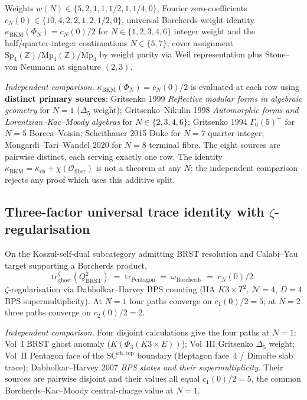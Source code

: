 Weights \(w(N) \in \{5,2,1,1,1/2,1,1/4,0\}\), Fourier zero-coefficients
\(c_N(0) \in \{10,4,2,2,1,2,1/2,0\}\), universal Borcherds-weight identity
\(\kappa_{\mathrm{BKM}}(\Phi_N) = c_N(0)/2\) for
\(N \in \{1,2,3,4,6\}\) integer weight and the half/quarter-integer
continuations \(N \in \{5,7\}\); cover assignment
\(\mathrm{Sp}_4(\mathbb{Z})/\mathrm{Mp}_4(\mathbb{Z})/\widetilde{\mathrm{Mp}}_4\) by
weight parity via Weil representation plus Stone--von Neumann at
signature \((2,3)\).

\noindent\emph{Independent comparison.}
\(\kappa_{\mathrm{BKM}}(\Phi_N) = c_N(0)/2\) is evaluated at each row using
\textbf{distinct primary sources}: Gritsenko 1999 \textit{Reflective
modular forms in algebraic geometry} for \(N=1\) (\(\Delta_5\) weight);
Gritsenko--Nikulin 1998 \textit{Automorphic forms and
Lorentzian--Kac--Moody algebras} for \(N \in \{2,3,4,6\}\);
Gritsenko 1994 \(\Gamma_0(5)^+\) for \(N=5\) Borcea--Voisin; Scheithauer
2015 Duke for \(N=7\) quarter-integer; Mongardi--Tari--Wandel 2020 for
\(N=8\) terminal fibre. The eight sources are pairwise distinct,
each serving exactly one row. The identity
\(\kappa_{\mathrm{BKM}} = \kappa_{\mathrm{ch}} + \chi(\mathcal{O}_{\mathrm{fiber}})\)
is not a theorem at any \(N\); the independent comparison rejects
any proof which uses this additive split.

\subsection{Three-factor universal trace identity with \texorpdfstring{\(\zeta\)}{zeta}-regularisation}
\label{v4-subsec:three-factor-UTI}

On the Koszul-self-dual subcategory admitting BRST resolution and
Calabi--Yau target supporting a Borcherds product,
\[
 \mathrm{tr}^{\zeta}_{\mathrm{ghost}}(Q_{\mathrm{BRST}}^2)
 \;=\; \mathrm{tr}_{\mathrm{Pentagon}}
 \;=\; \omega_{\mathrm{Borcherds}}
 \;=\; c_N(0)/2.
\]
\(\zeta\)-regularisation via Dabholkar--Harvey BPS counting (IIA
\(K3\times T^2\), \(\mathcal{N}=4\), \(D=4\) BPS supermultiplicity).
At \(N=1\) four paths converge on \(c_1(0)/2=5\); at \(N=2\) three paths
converge on \(c_2(0)/2=2\).

\noindent\emph{Independent comparison.} Four disjoint calculations
give the four paths at \(N=1\): Vol~I BRST ghost anomaly (\(K(\Phi_3(K3\times E))\));
Vol~III Gritsenko \(\Delta_5\) weight; Vol~II Pentagon face of the
\(\mathrm{SC}^{\mathrm{ch,top}}\) boundary (Heptagon face~4 / Dimofte
slab trace); Dabholkar--Harvey 2007 \textit{BPS states and their
supermultiplicity}. Their sources are pairwise disjoint and their
values all equal \(c_1(0)/2 = 5\), the
common Borcherds--Kac--Moody central-charge value at \(N=1\).

